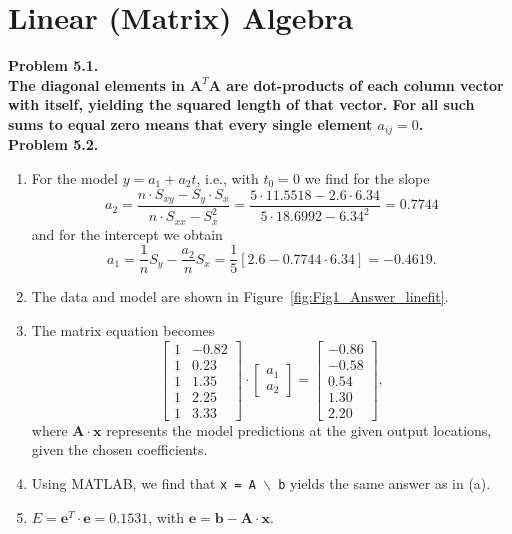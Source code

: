 \section{Linear (Matrix) Algebra}

\noindent
\bf{Problem 5.1.} \\

The diagonal elements in $\mathbf{A}^T\mathbf{A}$ are dot-products of each column vector
with itself, yielding the squared length of that vector.  For all such sums to equal zero
means that every single element $a_{ij} = 0$.
\\

\noindent
\bf{Problem 5.2.} \\

\begin{enumerate}[label=\alph*)]
\item For the model $y = a_1 + a_2t$, i.e., with $t_0 = 0$ we find for the slope
\[
a_2 = \frac{n \cdot S_{xy} - S_y \cdot S_x}{n \cdot S_{xx} - S_x^2} = \frac{5 \cdot 11.5518 - 2.6 \cdot 6.34}{5 \cdot 18.6992 - 6.34^2} = 0.7744
\]
and for the intercept we obtain
\[
a_1 = \frac{1}{n}S_y - \frac{a_2}{n}S_x = \frac{1}{5}[2.6 - 0.7744 \cdot 6.34] = -0.4619.
\]
\item The data and model are shown in Figure~\ref{fig:Fig1_Answer_linefit}.

\item The matrix equation becomes
\[
\left [ \begin{array}{rr}
1 & -0.82 \\
1 & 0.23 \\
1 & 1.35 \\
1 & 2.25 \\
1 & 3.33
\end{array} \right ] \cdot 
\left [ \begin{array}{r}
a_1 \\ a_2 \end{array} \right ] =
\left [ \begin{array}{r}
-0.86 \\ -0.58 \\ 0.54 \\ 1.30 \\ 2.20 \end{array} \right ],
\]
where $\mathbf{A \cdot x}$ represents the model predictions at the given output locations, given the chosen coefficients.
\item Using MATLAB, we find that \texttt{x = A $\backslash$ b} yields the same answer as in (a).
\item $E = \mathbf{e}^T\cdot\mathbf{e} = 0.1531$, with $\mathbf{e} = \mathbf{b} - \mathbf{A \cdot x}$.
\end{enumerate}


